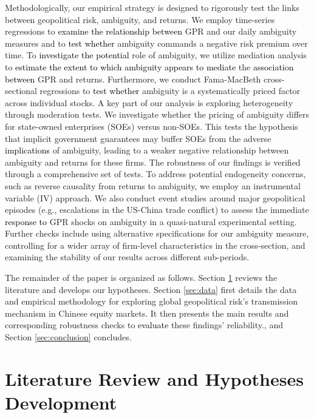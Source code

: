 \documentclass[preprint,12pt,authoryear]{elsarticle}
\begin{document}
Methodologically, our empirical strategy is designed to rigorously test the links between geopolitical risk, ambiguity, and returns. We employ time-series regressions to \textcolor{black}{examine the relationship between} GPR and our daily ambiguity measures and to \textcolor{black}{test whether} ambiguity commands a negative risk premium over time. To \textcolor{black}{investigate the potential} role of ambiguity, we utilize mediation analysis to \textcolor{black}{estimate the extent to which ambiguity appears to mediate} the \textcolor{black}{association between} GPR and returns. Furthermore, we conduct Fama-MacBeth cross-sectional regressions to \textcolor{black}{test whether} ambiguity is a systematically priced factor across individual stocks. A key part of our analysis is exploring heterogeneity through moderation tests. We investigate whether the pricing of ambiguity differs for state-owned enterprises (SOEs) versus non-SOEs. This tests the hypothesis that implicit government guarantees may buffer SOEs from the adverse \textcolor{black}{implications} of ambiguity, leading to a weaker negative relationship between ambiguity and returns for these firms. The robustness of our findings is verified through a comprehensive set of tests. To address potential endogeneity concerns, such as reverse causality from returns to ambiguity, we employ an instrumental variable (IV) approach. We also conduct event studies around major geopolitical episodes (e.g., escalations in the US-China trade conflict) to assess the immediate \textcolor{black}{response to} GPR shocks on ambiguity in a quasi-natural experimental setting. Further checks include using alternative specifications for our ambiguity measure, controlling for a wider array of firm-level characteristics in the cross-section, and examining the stability of our results across different sub-periods.

The remainder of the paper is organized as follows. Section \ref{sec:literature} reviews the literature and develops our hypotheses. Section \ref{sec:data} first details the data and empirical methodology for exploring global geopolitical risk’s transmission mechanism in Chinese equity markets. It then presents the main results and corresponding robustness checks to \textcolor{black}{evaluate} these findings’ reliability., and Section \ref{sec:conclusion} concludes.

\section{Literature Review and Hypotheses Development}
\label{sec:literature}
\end{document}
